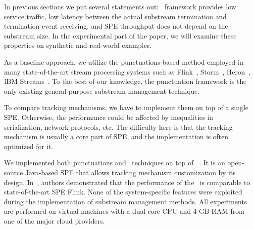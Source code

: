 \label {fs-experiments}


In previous sections we put several statements out: \tracker\ framework provides low service traffic, low latency between the actual substream termination and termination event receiving, and SPE throughput does not depend on the substream size. In the experimental part of the paper, we will examine these properties on synthetic and real-world examples. 

As a baseline approach, we utilize the punctuations-based method employed in many state-of-the-art stream processing systems such as Flink~\cite{Carbone:2017:SMA:3137765.3137777}, Storm~\cite{apache:storm:state}, Heron~\cite{Kulkarni:2015:THS:2723372.2742788}, IBM Streams~\cite{jacques2016consistent}. To the best of our knowledge, the punctuation framework is the only existing general-purpose substream management technique.



To compare tracking mechanisms, we have to implement them on top of a single SPE. Otherwise, the performance could be affected by inequalities in serialization, network protocols, etc.  The difficulty here is that the tracking mechanism is usually a core part of SPE, and the implementation is often optimized for it. 

We implemented both punctuations and \tracker\ techniques on top of \FlameStream~\cite{we2018beyondmr}. It is an open-source Java-based SPE that allows tracking mechanism customization by its design. In~\cite{we2018adbis}, authors demonstrated that the performance of the \FlameStream\ is comparable to state-of-the-art SPE Flink. None of the system-specific features were exploited during the implementation of substream management methods. All experiments are performed on virtual machines with a dual-core CPU and 4 GB RAM from one of the major cloud providers. 

